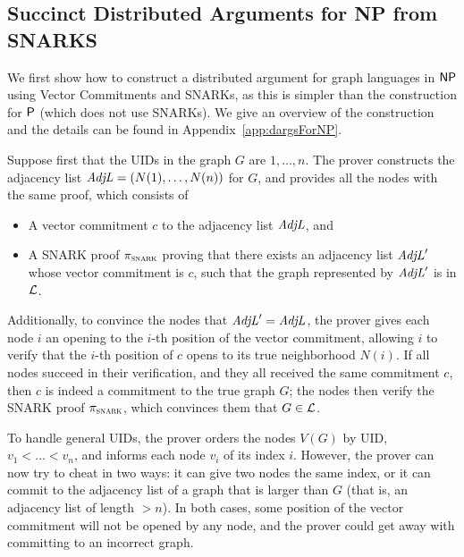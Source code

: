 \subsection{Succinct Distributed Arguments for NP from SNARKS}\label{sec:dargsForNP}
We first show how to construct a distributed argument for graph languages in ${\mathsf{NP}}$ using Vector Commitments and SNARKs,
as this is simpler than the construction for ${\mathsf{P}}$ (which does not use SNARKs).
We give an overview of the construction and the details
can be found in Appendix~\ref{app:dargsForNP}.


Suppose first that the UIDs in the graph $G$ are $1,\ldots,n$.
The prover constructs the adjacency list $\mathit{ AdjL } = (N(1),\ldots,N(n))$ for $G$,
and
provides all the nodes with the same proof, which consists of
\begin{itemize}
	\item A vector commitment $c$ to the adjacency list $\mathit{ AdjL }$, and
        \item A SNARK proof $\pi_\textsc{snark}$ proving that there exists an adjacency list $\mathit{ AdjL }'$ whose vector commitment is $c$, such that the graph represented by $\mathit{ AdjL }'$ is in $\mathcal{L}$.
\end{itemize}
Additionally, to convince the nodes that $\mathit{ AdjL }' = \mathit{ AdjL }$,
the prover gives each node $i$ an opening to the $i$-th position of the vector commitment, allowing $i$ to verify that the $i$-th position of $c$ opens to its true neighborhood $N(i)$.
If all nodes succeed in their verification, and they all received the same commitment $c$, then $c$ is indeed a commitment to the true graph $G$; the nodes then verify the SNARK proof $\pi_\textsc{snark}$, which convinces them that $G \in \mathcal{L}$.

To handle general UIDs, the prover orders the nodes $V(G)$ by UID, $v_1 < \ldots < v_n$,
and informs each node $v_i$ of its index $i$.
However, the prover can now try to cheat in two ways:
it can give two nodes the same index, or it can commit to the adjacency list of a graph that is
larger than $G$ (that is, an adjacency list of length $> n$).
In both cases, some position of the vector commitment will not be opened by any node,
and the prover could get away with committing to an incorrect graph.

